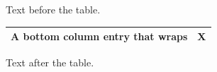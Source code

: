 \documentclass[12pt]{article}
\begin{document}
Text before the table.

\begin{tabular}{|b{3cm}|l|}\hline A bottom column entry that wraps & X\\\hline\end{tabular}

Text after the table.
\end{document}
